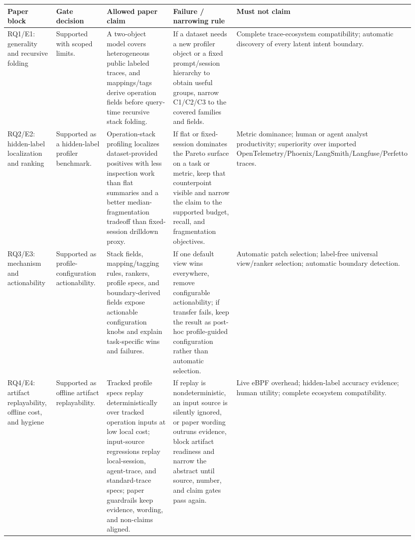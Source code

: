 \begin{tabular}{p{0.15\linewidth}p{0.17\linewidth}p{0.25\linewidth}p{0.20\linewidth}p{0.18\linewidth}}
\toprule
Paper block & Gate decision & Allowed paper claim & Failure / narrowing rule & Must not claim \\
\midrule
RQ1/E1: generality and recursive folding & Supported with scoped limits. & A two-object model covers heterogeneous public labeled traces, and mappings/tags derive operation fields before query-time recursive stack folding. & If a dataset needs a new profiler object or a fixed prompt/session hierarchy to obtain useful groups, narrow C1/C2/C3 to the covered families and fields. & Complete trace-ecosystem compatibility; automatic discovery of every latent intent boundary. \\
RQ2/E2: hidden-label localization and ranking & Supported as a hidden-label profiler benchmark. & Operation-stack profiling localizes dataset-provided positives with less inspection work than flat summaries and a better median-fragmentation tradeoff than fixed-session drilldown proxy. & If flat or fixed-session dominates the Pareto surface on a task or metric, keep that counterpoint visible and narrow the claim to the supported budget, recall, and fragmentation objectives. & Metric dominance; human or agent analyst productivity; superiority over imported OpenTelemetry/Phoenix/LangSmith/Langfuse/Perfetto traces. \\
RQ3/E3: mechanism and actionability & Supported as profile-configuration actionability. & Stack fields, mapping/tagging rules, rankers, profile specs, and boundary-derived fields expose actionable configuration knobs and explain task-specific wins and failures. & If one default view wins everywhere, remove configurable actionability; if transfer fails, keep the result as post-hoc profile-guided configuration rather than automatic selection. & Automatic patch selection; label-free universal view/ranker selection; automatic boundary detection. \\
RQ4/E4: artifact replayability, offline cost, and hygiene & Supported as offline artifact replayability. & Tracked profile specs replay deterministically over tracked operation inputs at low local cost; input-source regressions replay local-session, agent-trace, and standard-trace specs; paper guardrails keep evidence, wording, and non-claims aligned. & If replay is nondeterministic, an input source is silently ignored, or paper wording outruns evidence, block artifact readiness and narrow the abstract until source, number, and claim gates pass again. & Live eBPF overhead; hidden-label accuracy evidence; human utility; complete ecosystem compatibility. \\
\bottomrule
\end{tabular}
